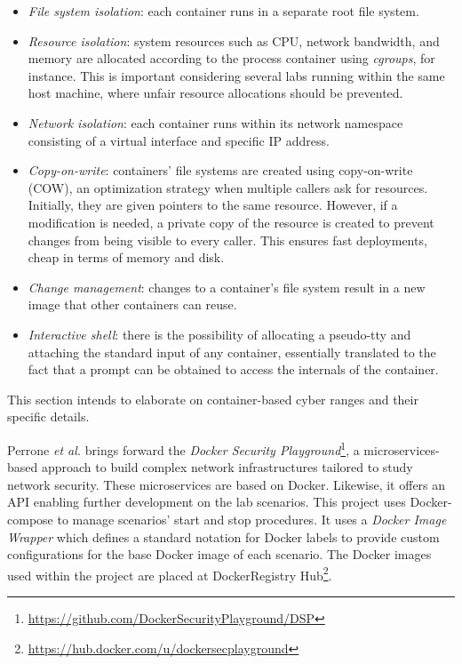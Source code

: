 \begin{itemize}
    \item \textit{File system isolation}: each container runs in a separate root file system.
    \item \textit{Resource isolation}: system resources such as CPU, network bandwidth, and memory are allocated according to the process container using \textit{cgroups}, for instance. This is important considering several labs running within the same host machine, where unfair resource allocations should be prevented.
    \item \textit{Network isolation}: each container runs within its network namespace consisting of a virtual interface and specific IP address.
    \item \textit{Copy-on-write}: containers' file systems are created using copy-on-write (COW), an optimization strategy when multiple callers ask for resources. Initially, they are given pointers to the same resource. However, if a modification is needed, a private copy of the resource is created to prevent changes from being visible to every caller. This ensures fast deployments, cheap in terms of memory and disk.
    \item \textit{Change management}: changes to a container's file system result in a new image that other containers can reuse.
    \item \textit{Interactive shell}: there is the possibility of allocating a pseudo-tty and attaching the standard input of any container, essentially translated to the fact that a prompt can be obtained to access the internals of the container.
\end{itemize}

This section intends to elaborate on container-based cyber ranges and their specific details.


Perrone \textit{et al.} \cite{dsp_ref} brings forward the \textit{Docker Security Playground}\footnote{\url{https://github.com/DockerSecurityPlayground/DSP}}, a microservices-based approach to build complex network infrastructures tailored to study network security. These microservices are based on Docker. Likewise, it offers an API enabling further development on the lab scenarios. This project uses Docker-compose to manage scenarios' start and stop procedures. It uses a \textit{Docker Image Wrapper} which defines a standard notation for Docker labels to provide custom configurations for the base Docker image of each scenario. The Docker images used within the project are placed at DockerRegistry Hub\footnote{\url{https://hub.docker.com/u/dockersecplayground}}.

